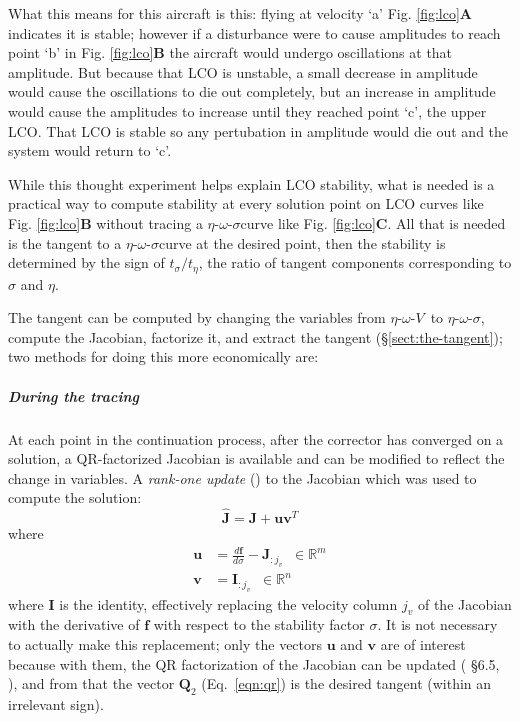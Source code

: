 \documentclass[10pt,openany,twoside]{book}
\numberwithin{equation}{section}   %
\newcommand{\Matrix}[1]{\boldsymbol{#1}}
\newcommand{\Vector}[1]{\boldsymbol{#1}}
\newcommand{\Sectref}[1]{\S\ref{#1}}
\newcommand{\Eqn}[1]{Eq.\ \ref{#1}}
\newcommand{\Figref}[1]{Fig. \ref{#1}}
\newcommand{\EOV}{$\eta$-$\omega$-$V$\:}                 %
\newcommand{\EOS}{$\eta$-$\omega$-$\sigma$\:}            %
\begin{document}
What this means for this aircraft is this: flying at velocity `a'
\Figref{fig:lco}{\bf A} indicates it is stable; however if a disturbance
were to cause amplitudes to reach point `b' in
\Figref{fig:lco}{\bf B}
the aircraft would undergo oscillations at that amplitude. But because
that LCO is unstable, a small decrease in amplitude would cause the
oscillations to die out completely, but an increase in amplitude would
cause the amplitudes to increase until they reached point `c', the
upper LCO. That LCO is stable so any pertubation in amplitude would
die out and the system would return to `c'.

While this thought experiment helps explain LCO stability, what is
needed is a practical way to compute stability at every solution point on
LCO curves like
\Figref{fig:lco}{\bf B}
without tracing a \EOS curve like \Figref{fig:lco}{\bf C}.
All that is needed is the tangent to a \EOS curve at the desired point,
then the stability is determined by the sign of
$t_{\sigma}/t_{\eta}$,
the ratio of tangent components corresponding to $\sigma$ and $\eta$.

The tangent can be computed by changing the variables from \EOV\ to \EOS,
compute the Jacobian, factorize it, and extract the tangent
(\Sectref{sect:the-tangent}); two methods for doing this more economically
are:

\subparagraph{During the tracing}
At each point in the continuation process, after the corrector has
converged on a solution, a QR-factorized Jacobian is available and
can be modified to reflect the change in variables.
A \emph{rank-one update} (\cite{golub2013matrix}) to the Jacobian which was
used to compute the solution:
\begin{equation}
\Matrix{\hat{J}} = \Matrix{J} + \Vector{u}\Vector{v}^T
\end{equation}
where
\begin{align}
\Vector{u} &= \frac{d\Vector{f}}{d\sigma} - \Matrix{J}_{:j_v} \;\; \in \mathbb{R}^m \nonumber \\
\Vector{v} &= \Matrix{I}_{:j_v} \;\; \in \mathbb{R}^n
\end{align}
where $\Matrix{I}$ is the identity,
effectively replacing the velocity column $j_v$ of the Jacobian with the derivative
of $\Vector{f}$ with respect to the stability factor $\sigma$.
It is not necessary to actually make this replacement; only the vectors
$\Vector{u}$ and $\Vector{v}$ are of interest because with them,
the QR factorization of the Jacobian can be updated
(\cite{golub2013matrix} \S 6.5, \cite{qrupdate}),
and from that the vector $\Matrix{Q}_2$
(\Eqn{eqn:qr})
is the desired tangent (within an irrelevant sign).
\end{document}
